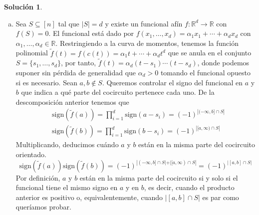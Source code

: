 \documentclass[10pt]{article}
\theoremstyle{definition}
\newtheorem*{sol}{Solución}
\begin{document}
\begin{sol}\leavevmode
\begin{enumerate}[(a)]
\item Sea $S\subseteq [n]$ tal que $|S|=d$ y existe un funcional afín $f:\mathbb{R}^d\longrightarrow\mathbb{R}$ con $f(S)=0$. El funcional está dado por $f(x_1,\ldots, x_d)=\alpha_1x_1+\cdots + \alpha_d x_d$ con $\alpha_1,\ldots,\alpha_d\in\mathbb{R}$. Restringiendo a la curva de momentos, tenemos la función polinomial $\tilde{f}(t)=f(c(t))=\alpha_1t+\cdots+\alpha_d t^d$ que se anula en el  conjunto $S=\{s_1,\ldots, s_d\}$, por tanto, $\tilde{f}(t)=\alpha_d(t-s_1)\cdots (t-s_d)$, donde podemos suponer sin pérdida de generalidad que $\alpha_d>0$ tomando el funcional opuesto si es necesario. Sean $a,b\notin S$. Queremos controlar el signo del funcional en $a$ y $b$ que indica a qué parte del cocircuito pertenece cada uno. De la descomposición anterior tenemos que
\begin{align*}
     &\text{sign}\left(\tilde{f}(a)\right) =  \prod_{i=1}^d\text{sign}(a-s_i) = (-1)^{|(-\infty,b]\cap S|}\\
    & \text{sign}\left(\tilde{f}(b)\right) =  \prod\limits_{i=1}^d\text{sign}(b-s_i)  =  (-1)^{|[a,\infty)\cap S|}
\end{align*}
Multiplicando, deducimos cuándo $a$ y $b$ están en la misma parte del cocircuito orientado.
$$\text{sign}\left(\tilde{f}(a)\right)\text{sign}\left(\tilde{f}(b)\right)=(-1)^{|(-\infty,b]\cap S|+|[a,\infty)\cap S|}=(-1)^{|[a,b]\cap S|}$$
Por definición, $a$ y $b$ están en la misma parte del cocircuito si y solo si el funcional tiene el mismo signo en $a$ y en $b$, es decir, cuando el producto anterior
es positivo o, equivalentemente, cuando $|[a,b]\cap S|$ es par como queríamos probar.




\end{enumerate}
\end{sol}
\end{document}

